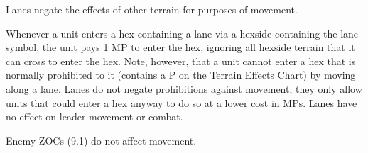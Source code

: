  Lanes negate the effects of other terrain for purposes of movement.

Whenever a unit enters a hex containing a lane via a hexside containing the lane symbol, the unit pays 1 MP to enter the hex, ignoring all hexside terrain that it can cross to enter the hex. Note, however, that a unit cannot enter a hex that is normally prohibited to it (contains a P on the Terrain Effects Chart) by moving along a lane. Lanes do not negate prohibitions against movement; they only allow units that could enter a hex anyway to do so at a lower cost in MPs. Lanes have no effect on leader movement or combat.

 Enemy ZOCs (9.1) do not affect movement.
